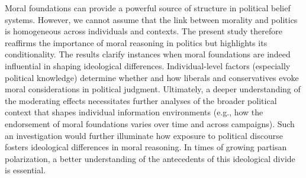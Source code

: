 \documentclass[12pt]{article}
\begin{document}
Moral foundations can provide a powerful source of structure in political belief systems. However, we cannot assume that the link between morality and politics is homogeneous across individuals and contexts. The present study therefore reaffirms the importance of moral reasoning in politics but highlights its conditionality. The results clarify instances when moral foundations are indeed influential in shaping ideological differences. Individual-level factors (especially political knowledge) determine whether and how liberals and conservatives evoke moral considerations in political judgment. Ultimately, a deeper understanding of the moderating effects necessitates further analyses of the broader political context that shapes individual information environments (e.g., how the endorsement of moral foundations varies over time and across campaigns). Such an investigation would further illuminate how exposure to political discourse fosters ideological differences in moral reasoning. In times of growing partisan polarization, a better understanding of the antecedents of this ideological divide is essential.

\clearpage


\end{document}

